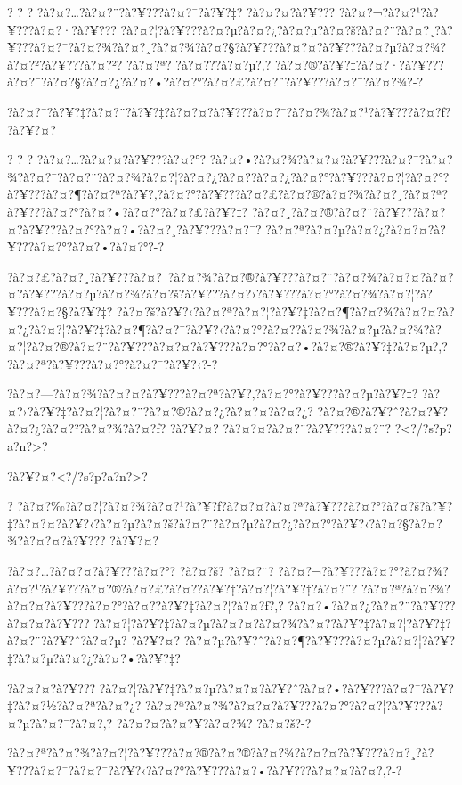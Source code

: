 \documentclass[11pt, openany]{book}
\begin{document}
{{{{{{{{{{{? ? ? ?à?¤?\ldots{}?à?¤?¨?à?¥???à?¤?¯?à?¥?‡? ?à?¤?¤?à?¥???
?à?¤?¬?à?¤?¹?à?¥???à?¤?·?à?¥???
?à?¤?¦?à?¥???à?¤?µ?à?¤?¿?à?¤?µ?à?¤?š?à?¤?¨?à?¤?¸?à?¥???à?¤?¯?à?¤?¾?à?¤?¸?à?¤?¾?à?¤?§?à?¥???à?¤?¤?à?¥???à?¤?µ?à?¤?¾?à?¤?²?à?¥???à?¤?²?
?à?¤?ª? ?à?¤???à?¤?µ?,?
?à?¤?®?à?¥?‡?à?¤?·?à?¥???à?¤?¯?à?¤?§?à?¤?¿?à?¤?•?à?¤?°?à?¤?£?à?¤?¨?à?¥???à?¤?¯?à?¤?¾?-?

?à?¤?¯?à?¥?‡?à?¤?¨?à?¥?‡?à?¤?¤?à?¥???à?¤?¯?à?¤?¾?à?¤?¹?à?¥???à?¤?ƒ?
?à?¥?¤?

? ? ? ?à?¤?\ldots{}?à?¤?¤?à?¥???à?¤?°?
?à?¤?•?à?¤?¾?à?¤?¤?à?¥???à?¤?¯?à?¤?¾?à?¤?¯?à?¤?¨?à?¤?¾?à?¤?¦?à?¤?¿?à?¤?­?à?¤?¿?à?¤?°?à?¥???à?¤?¦?à?¤?°?à?¥???à?¤?¶?à?¤?ª?à?¥?‚?à?¤?°?à?¥???à?¤?£?à?¤?®?à?¤?¾?à?¤?¸?à?¤?ª?à?¥???à?¤?°?à?¤?•?à?¤?°?à?¤?£?à?¥?‡?
?à?¤?¸?à?¤?®?à?¤?¨?à?¥???à?¤?¤?à?¥???à?¤?°?à?¤?•?à?¤?¸?à?¥???à?¤?¯?
?à?¤?ª?à?¤?µ?à?¤?¿?à?¤?¤?à?¥???à?¤?°?à?¤?•?à?¤?°?-?

?à?¤?£?à?¤?¸?à?¥???à?¤?¯?à?¤?¾?à?¤?®?à?¥???à?¤?¨?à?¤?¾?à?¤?¤?à?¤?¤?à?¥???à?¤?µ?à?¤?¾?à?¤?š?à?¥???à?¤?›?à?¥???à?¤?°?à?¤?¾?à?¤?¦?à?¥???à?¤?§?à?¥?‡?
?à?¤?š?à?¥?‹?à?¤?ª?à?¤?¦?à?¥?‡?à?¤?¶?à?¤?¾?à?¤?¤?à?¤?¿?à?¤?¦?à?¥?‡?à?¤?¶?à?¤?¯?à?¥?‹?à?¤?°?à?¤?­?à?¤?¾?à?¤?µ?à?¤?¾?à?¤?¦?à?¤?®?à?¤?¨?à?¥???à?¤?¤?à?¥???à?¤?°?à?¤?•?à?¤?®?à?¥?‡?à?¤?µ?,?
?à?¤?ª?à?¥???à?¤?°?à?¤?¯?à?¥?‹?-?

?à?¤?---?à?¤?¾?à?¤?¤?à?¥???à?¤?ª?à?¥?‚?à?¤?°?à?¥???à?¤?µ?à?¥?‡?
?à?¤?›?à?¥?‡?à?¤?¦?à?¤?¨?à?¤?®?à?¤?¿?à?¤?¤?à?¤?¿?
?à?¤?®?à?¥?ˆ?à?¤?¥?à?¤?¿?à?¤?²?à?¤?¾?à?¤?ƒ? ?à?¥?¤?
?à?¤?¤?à?¤?¨?à?¥???à?¤?¨? ?\textless{}?/?s?p?a?n?\textgreater{}?

?à?¥?¤?\textless{}?/?s?p?a?n?\textgreater{}?

?
?à?¤?‰?à?¤?¦?à?¤?¾?à?¤?¹?à?¥?ƒ?à?¤?¤?à?¤?ª?à?¥???à?¤?°?à?¤?š?à?¥?‡?à?¤?¤?à?¥?‹?à?¤?µ?à?¤?š?à?¤?¨?à?¤?µ?à?¤?¿?à?¤?°?à?¥?‹?à?¤?§?à?¤?¾?à?¤?¤?à?¥???
?à?¥?¤?

?à?¤?\ldots{}?à?¤?¤?à?¥???à?¤?°? ?à?¤?š? ?à?¤?¨?
?à?¤?¬?à?¥???à?¤?°?à?¤?¾?à?¤?¹?à?¥???à?¤?®?à?¤?£?à?¤?­?à?¥?‡?à?¤?¦?à?¥?‡?à?¤?¨?
?à?¤?ª?à?¤?¾?à?¤?¤?à?¥???à?¤?°?à?¤?­?à?¥?‡?à?¤?¦?à?¤?ƒ?,?
?à?¤?•?à?¤?¿?à?¤?¨?à?¥???à?¤?¤?à?¥???
?à?¤?¦?à?¥?‡?à?¤?µ?à?¤?¤?à?¤?¾?à?¤?­?à?¥?‡?à?¤?¦?à?¥?‡?à?¤?¨?à?¥?ˆ?à?¤?µ?
?à?¥?¤?
?à?¤?µ?à?¥?ˆ?à?¤?¶?à?¥???à?¤?µ?à?¤?¦?à?¥?‡?à?¤?µ?à?¤?¿?à?¤?•?à?¥?‡?

?à?¤?¤?à?¥???
?à?¤?¦?à?¥?‡?à?¤?µ?à?¤?¤?à?¥?ˆ?à?¤?•?à?¥???à?¤?¯?à?¥?‡?à?¤?½?à?¤?ª?à?¤?¿?
?à?¤?ª?à?¤?¾?à?¤?¤?à?¥???à?¤?°?à?¤?¦?à?¥???à?¤?µ?à?¤?¯?à?¤?‚?
?à?¤?¤?à?¤?¥?à?¤?¾? ?à?¤?š?-?

?à?¤?ª?à?¤?¾?à?¤?¦?à?¥???à?¤?®?à?¤?®?à?¤?¾?à?¤?¤?à?¥???à?¤?¸?à?¥???à?¤?¯?à?¤?¯?à?¥?‹?à?¤?°?à?¥???à?¤?•?à?¥???à?¤?¤?à?¤?‚?-?

}}}}}}}}}}}
\end{document}
